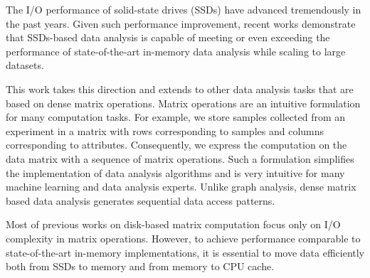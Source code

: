 

The I/O performance of solid-state drives (SSDs) have advanced tremendously in
the past years. Given such performance improvement, recent works
\cite{flashgraph, gridgraph} demonstrate that SSDs-based data analysis is
capable of meeting or even exceeding the performance of state-of-the-art
in-memory data analysis while scaling to large datasets.

This work takes this direction and extends to other data analysis tasks
that are based on dense matrix operations. Matrix operations are an intuitive
formulation for many computation tasks. For example, we store samples
collected from an experiment in a matrix with rows corresponding to samples
and columns corresponding to attributes.
Consequently, we express the computation on the data matrix with a sequence
of matrix operations. Such a formulation simplifies the implementation of
data analysis algorithms and is very intuitive for many machine learning
and data analysis experts. Unlike graph analysis, dense matrix based data
analysis generates sequential data access patterns.

Most of previous works on disk-based matrix computation focus only on I/O
complexity in matrix operations\cite{}. However, to achieve performance
comparable to state-of-the-art in-memory implementations, it is essential
to move data efficiently both from SSDs to memory and from memory to CPU
cache.



